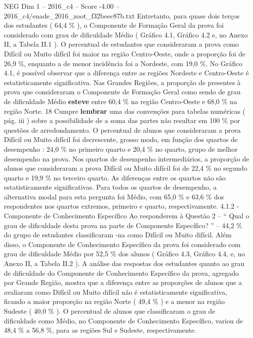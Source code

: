 \begin{textsample}{NEG Dim 1 – 2016\_c4 – Score -4.00 – 2016\_c4/enade\_2016\_zoot\_f32beec87b.txt}
Entretanto, para quase dois terços dos estudantes ( 64,4 \% ), o Componente de Formação Geral da prova foi considerado com grau de dificuldade Médio ( Gráfico 4.1, Gráfico 4.2 e, no Anexo II, a Tabela II.1 ).
O percentual de estudantes que consideraram a prova como Difícil ou Muito difícil foi maior na região Centro-Oeste, onde a proporção foi de 26,9 \%, enquanto a de menor incidência foi a Nordeste, com 19,0 \%.
No Gráfico 4.1, é possível observar que a diferença entre as regiões Nordeste e Centro-Oeste é estatisticamente significativa.
Nas Grandes Regiões, a proporção de presentes à prova que consideraram o Componente de Formação Geral como sendo de grau de dificuldade Médio \textbf{esteve} entre 60,4 \% na região Centro-Oeste e 68,0 \% na região Norte. 18 Cumpre \textbf{lembrar} uma das convenções para tabelas numéricas ( pág. iii ) sobre a possibilidade de a soma das partes não resultar em 100 \% por questões de arredondamento.
O percentual de alunos que consideraram a prova Difícil ou Muito difícil foi decrescente, grosso modo, em função dos quartos de desempenho : 24,0 \% no primeiro quarto e 20,4 \% no quarto, grupo de melhor desempenho na prova.
Nos quartos de desempenho intermediários, a proporção de alunos que consideraram a prova Difícil ou Muito difícil foi de 22,4 \% no segundo quarto e 19,9 \% no terceiro quarto.
As diferenças entre os quartos não são estatisticamente significativas.
Para todos os quartos de desempenho, a alternativa modal para esta pergunta foi Médio, com 65,0 \% e 63,6 \% dos respondentes nos quartos extremos, primeiro e quarto, respectivamente. 4.1.2 - Componente de Conhecimento Específico Ao responderem à Questão 2 – “ Qual o grau de dificuldade desta prova na parte de Componente Específico? ” – 44,2 \% do grupo de estudantes classificaram -na como Difícil ou Muito difícil.
Além disso, o Componente de Conhecimento Específico da prova foi considerado com grau de dificuldade Médio por 52,5 \% dos alunos ( Gráfico 4.3, Gráfico 4.4, e, no Anexo II, a Tabela II.2 ).
A análise das respostas dos estudantes quanto ao grau de dificuldade do Componente de Conhecimento Específico da prova, agregado por Grande Região, mostra que a diferença entre as proporções de alunos que a avaliaram como Difícil ou Muito difícil não é estatisticamente significativa, ficando a maior proporção na região Norte ( 49,4 \% ) e a menor na região Sudeste ( 40,0 \% ).
O percentual de alunos que classificaram o grau de dificuldade como Médio, no Componente de Conhecimento Específico, variou de 48,4 \% a 56,8 \%, para as regiões Sul e Sudeste, respectivamente.

\end{textsample}

